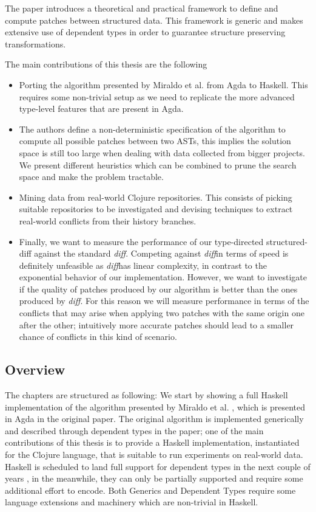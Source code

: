 \documentclass[11pt, titlepage]{article}
\newcommand{\diff}{\emph{diff}}
\begin{document}
The paper introduces a theoretical and practical framework to define and compute patches between structured data. This framework is generic and makes extensive use of dependent types in order to guarantee structure preserving transformations. 

The main contributions of this thesis are the following 
\begin{itemize}
\item Porting the algorithm presented by Miraldo et al. from Agda to Haskell. This requires some non-trivial setup as we need to replicate the more advanced type-level features that are present in Agda.
\item The authors define a non-deterministic specification of the algorithm to compute all possible patches between two ASTs, this implies the solution space is still too large when dealing with data collected from bigger projects. We present different heuristics which can be combined to prune the search space and make the problem tractable.
\item Mining data from real-world Clojure repositories. This consists of picking suitable repositories to be investigated and devising techniques to extract real-world conflicts from their history branches.
\item Finally, we want to measure the performance of our type-directed structured-diff against the standard \diff. Competing against \diff in terms of speed is definitely unfeasible as \diff has linear complexity, in contrast to the exponential behavior of our implementation. However, we want to investigate if the quality of patches produced by our algorithm is better than the ones produced by \diff. For this reason we will measure performance in terms of the conflicts that may arise when applying two patches with the same origin one after the other; intuitively more accurate patches should lead to a smaller chance of conflicts in this kind of scenario. 
\end{itemize}


\subsection{Overview}\label{overview}
The chapters are structured as following: 
We start by showing a full Haskell implementation of the algorithm presented by Miraldo et al. \cite{type-directed-diff}, which is presented in Agda in the original paper. 
The original algorithm is implemented generically and described through dependent types in the paper; one of the main contributions of this thesis is to provide a Haskell implementation, instantiated for the Clojure language, that is suitable to run experiments on real-world data. 
Haskell is scheduled to land full support for dependent types in the next couple of years \cite{dependent-haskell}, in the meanwhile, they can only be partially supported and require some additional effort to encode.
Both Generics and Dependent Types require some language extensions and machinery which are non-trivial in Haskell.
\end{document}
